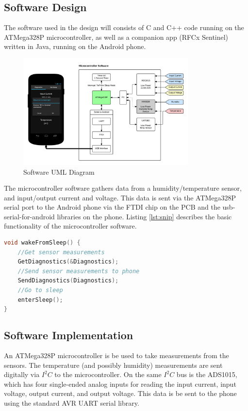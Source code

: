 \documentclass{article}
\numberwithin{figure}{section}
\numberwithin{equation}{section}
\begin{document}
{\newpage
\subsection{Software Design} \label{sect:softwaredes}
The software used in the design will consists of C and C++ code running on the ATMega328P microcontroller, as well as a companion app (RFCx Sentinel) written in Java, running on the Android phone.
\begin{figure}[H]
	\centering
	\includegraphics[width=0.8\textwidth]{SoftwareUMLV2}
	\caption{Software UML Diagram}
	\label{fig:swuml}
\end{figure}

The microcontroller software gathers data from a humidity/temperature sensor, and input/output current and voltage. This data is sent via the ATMega328P serial port to the Android phone via the FTDI chip on the PCB and the usb-serial-for-android libraries on the phone.
Listing \ref{lst:snip} describes the basic functionality of the microcontroller software.

\begin{lstlisting}[language=C,label=lst:snip,caption=MCU Flow Code Snippet]
void wakeFromSleep() {
    //Get sensor measurements
    GetDiagnostics(&Diagnostics);
    //Send sensor measurements to phone
    SendDiagnostics(Diagnostics);
    //Go to sleep
    enterSleep();
}
\end{lstlisting}

\subsection{Software Implementation} \label{sect:softwareimp}
An ATMega328P microcontroller is be used to take measurements from the sensors. The temperature (and possibly humidity) measurements are sent digitally via $I^2 C$ to the microcontroller. On the same $I^2 C$ bus is the ADS1015, which has four single-ended analog inputs for reading the input current, input voltage, output current, and output voltage. This data is be sent to the phone using the standard AVR UART serial library.

}
\end{document}
